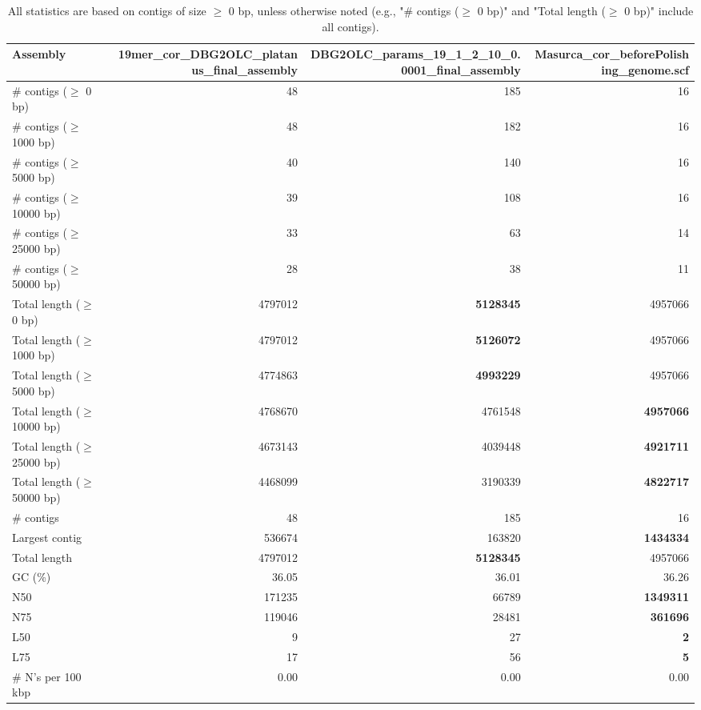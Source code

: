 \documentclass[12pt,a4paper]{article}
\begin{document}
\begin{table}[ht]
\begin{center}
\caption{All statistics are based on contigs of size $\geq$ 0 bp, unless otherwise noted (e.g., "\# contigs ($\geq$ 0 bp)" and "Total length ($\geq$ 0 bp)" include all contigs).}
\begin{tabular}{|l*{3}{|r}|}
\hline
Assembly & 19mer\_cor\_DBG2OLC\_platanus\_final\_assembly & DBG2OLC\_params\_19\_1\_2\_10\_0.0001\_final\_assembly & Masurca\_cor\_beforePolishing\_genome.scf \\ \hline
\# contigs ($\geq$ 0 bp) & 48 & 185 & 16 \\ \hline
\# contigs ($\geq$ 1000 bp) & 48 & 182 & 16 \\ \hline
\# contigs ($\geq$ 5000 bp) & 40 & 140 & 16 \\ \hline
\# contigs ($\geq$ 10000 bp) & 39 & 108 & 16 \\ \hline
\# contigs ($\geq$ 25000 bp) & 33 & 63 & 14 \\ \hline
\# contigs ($\geq$ 50000 bp) & 28 & 38 & 11 \\ \hline
Total length ($\geq$ 0 bp) & 4797012 & {\bf 5128345} & 4957066 \\ \hline
Total length ($\geq$ 1000 bp) & 4797012 & {\bf 5126072} & 4957066 \\ \hline
Total length ($\geq$ 5000 bp) & 4774863 & {\bf 4993229} & 4957066 \\ \hline
Total length ($\geq$ 10000 bp) & 4768670 & 4761548 & {\bf 4957066} \\ \hline
Total length ($\geq$ 25000 bp) & 4673143 & 4039448 & {\bf 4921711} \\ \hline
Total length ($\geq$ 50000 bp) & 4468099 & 3190339 & {\bf 4822717} \\ \hline
\# contigs & 48 & 185 & 16 \\ \hline
Largest contig & 536674 & 163820 & {\bf 1434334} \\ \hline
Total length & 4797012 & {\bf 5128345} & 4957066 \\ \hline
GC (\%) & 36.05 & 36.01 & 36.26 \\ \hline
N50 & 171235 & 66789 & {\bf 1349311} \\ \hline
N75 & 119046 & 28481 & {\bf 361696} \\ \hline
L50 & 9 & 27 & {\bf 2} \\ \hline
L75 & 17 & 56 & {\bf 5} \\ \hline
\# N's per 100 kbp & 0.00 & 0.00 & 0.00 \\ \hline
\end{tabular}
\end{center}
\end{table}
\end{document}
